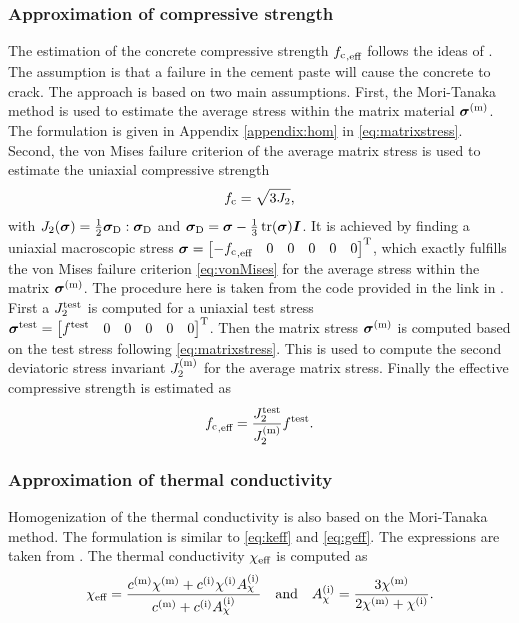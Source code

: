 \subsubsection{Approximation of compressive strength}
The estimation of the concrete compressive strength ${f_{\text{c}}}_{,\text{eff}}$ follows the ideas of \cite{nev_2018_mcam}.
The assumption is that a failure in the cement paste will cause the concrete to crack.
The approach is based on two main assumptions.
First, the Mori-Tanaka method is used to estimate the average stress within the matrix material $\boldsymbol{\sigma}^{(\text{m})}$. 
The formulation is given in Appendix \ref{appendix:hom} in \eqref{eq:matrixstress}.
Second, the von Mises failure criterion of the average matrix stress is used to estimate the uniaxial compressive strength
\begin{align}
	{f_{\text{c}}} = \sqrt{3 J_2},  \label{eq:vonMises}
\end{align}
with $J_2(\boldsymbol{\sigma}) = \frac{1}{2} \boldsymbol{\sigma}_{\text{D}}:\boldsymbol{\sigma}_{\text{D}}$ and $\boldsymbol{\sigma}_{\text{D}} = \boldsymbol{\sigma} - \frac{1}{3}\operatorname{tr}(\boldsymbol{\sigma})\boldsymbol{I}$.
It is achieved by finding a uniaxial macroscopic stress $\boldsymbol{\sigma} = \begin{bmatrix} -{f_{\text{c}}}_{,\text{eff}} & 0 & 0 &0&0&0 \end{bmatrix}^\text{T}$, which exactly fulfills the von Mises failure criterion \eqref{eq:vonMises} for the average stress within the matrix $\boldsymbol{\sigma}^{(\text{m})}$.
The procedure here is taken from the code provided in the link in \cite{nee_2012_ammf}.
First a $J_2^{\text{test}}$ is computed for a uniaxial test stress $\boldsymbol{\sigma}^{\text{test}} = \begin{bmatrix} f^{\text{test}} & 0 & 0 &0&0&0 \end{bmatrix}^\text{T}$. 
Then the matrix stress $\boldsymbol{\sigma}^{(\text{m})}$ is computed based on the test stress following \eqref{eq:matrixstress}. 
This is used to compute the second deviatoric stress invariant $J_2^{(\text{m})}$ for the average matrix stress.
Finally the effective compressive strength is estimated as
\begin{align}
	{f_{\text{c}}}_{,\text{eff}} = \frac{J_2^{\text{test}}}{J_2^{(\text{m})}} f^{\text{test}}.
\end{align}
\subsubsection{Approximation of thermal conductivity }
Homogenization of the thermal conductivity is also based on the Mori-Tanaka method.
The formulation is similar to \eqref{eq:keff} and \eqref{eq:geff}.
The expressions are taken from \cite{str_2011_mbeo}.
The thermal conductivity $\chi_{\text{eff}}$ is computed as
\begin{align}
	\chi_{\text{eff}} = \dfrac{c^{(\text{m})}\chi^{(\text{m})} + c^{(\text{i})} \chi^{(\text{i})} A_{\chi}^{(\text{i})}}{c^{(\text{m})} +  c^{(\text{i})} A_{\chi}^{(\text{i})}}\quad\text{and}\quad
	A_{\chi}^{(\text{i})} = \frac{3\chi^{(\text{m})}}{2\chi^{(\text{m})}+\chi^{(\text{i})}}.
\end{align}
